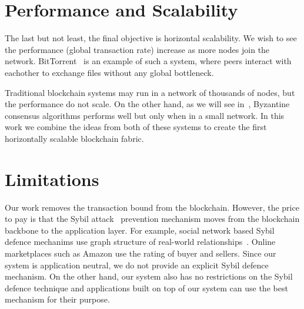 \section{Performance and Scalability}

The last but not least, the final objective is horizontal scalability.
We wish to see the performance (global transaction rate) increase as more nodes join the network.
BitTorrent~\cite{cohen2003incentives} is an example of such a system,
where peers interact with eachother to exchange files without any global bottleneck.

Traditional blockchain systems may run in a network of thousands of nodes, but the performance do not scale.
On the other hand, as we will see in~, Byzantine consensus algorithms performs well but only when in a small network.
In this work we combine the ideas from both of these systems to create the first horizontally scalable blockchain fabric.

\section{Limitations}
Our work removes the transaction bound from the blockchain.
However, the price to pay is that the Sybil attack~\cite{douceur2002sybil} prevention mechanism moves from the blockchain backbone to the application layer.
For example, social network based Sybil defence mechanims use graph structure of real-world relationships~\cite{yu2006sybilguard}.
Online marketplaces such as Amazon use the rating of buyer and sellers.
Since our system is application neutral, we do not provide an explicit Sybil defence mechanism.
On the other hand, our system also has no restrictions on the Sybil defence technique
and applications built on top of our system can use the best mechanism for their purpose.



